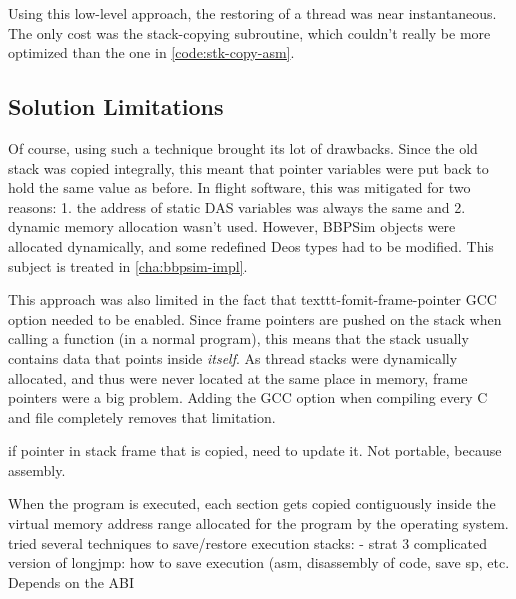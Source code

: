 Using this low-level approach, the restoring of a thread was near instantaneous. The only cost was the stack-copying subroutine, which couldn't really be more optimized than the one in \autoref{code:stk-copy-asm}.

\subsection*{Solution Limitations}
Of course, using such a technique brought its lot of drawbacks. Since the old stack was copied integrally, this meant that pointer variables were put back to hold the same value as before. In flight software, this was mitigated for two reasons: 1. the address of static DAS variables was always the same and 2. dynamic memory allocation wasn't used. However, BBPSim objects were allocated dynamically, and some redefined Deos types had to be modified. This subject is treated in \autoref{cha:bbpsim-impl}. 

This approach was also limited in the fact that \the texttt{-fomit-frame-pointer} GCC option needed to be enabled. Since frame pointers are pushed on the stack when calling a function (in a normal program), this means that the stack usually contains data that points inside \textit{itself}. As thread stacks were dynamically allocated, and thus were never located at the same place in memory, frame pointers were a big problem. Adding the GCC option when compiling every C and \Cpp file completely removes that limitation.



if pointer in stack frame that is copied, need to update it.  Not portable, because assembly. 


When the program is executed, each section gets copied contiguously inside the virtual memory address range allocated for the program by the operating system. 
tried several techniques to save/restore execution stacks:
- strat 3 complicated version of longjmp: how to save execution (asm, disassembly of code, save sp, etc.%
Depends on the ABI

